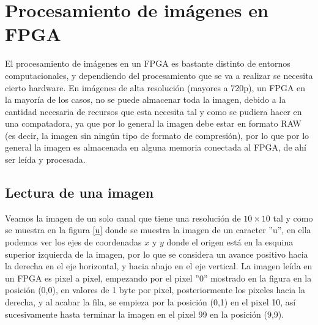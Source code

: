 \documentclass[twoside,spanish,ESP,MSc]{plantillaLabUPV}
\theoremstyle{definition}
\begin{document}
\section{Procesamiento de imágenes en FPGA}

El procesamiento de imágenes en un FPGA es bastante distinto de entornos computacionales, y dependiendo del procesamiento que se va a realizar se necesita cierto hardware. En imágenes de alta resolución (mayores a 720p), un FPGA en la mayoría de los casos, no se puede almacenar toda la imagen, debido a la cantidad necesaria de recursos que esta necesita tal y como se pudiera hacer en una compatadora, ya que por lo general la imagen debe estar en formato RAW (es decir, la imagen sin ningún tipo de formato de compresión), por lo que por lo general la imagen es almacenada en alguna memoria conectada al FPGA, de ahí ser leída y procesada.

\subsection*{Lectura de una imagen}
Veamos la imagen de un solo canal que tiene una resolución de $10\times10$ tal y como se muestra en la figura \ref{u} donde se muestra la imagen de un caracter ''u'', en ella podemos ver los ejes de coordenadas $x$ y $y$ donde el origen está en la esquina superior izquierda de la imagen, por lo que se considera un avance positivo hacia la derecha en el eje horizontal, y hacia abajo en el eje vertical. La imagen leída en un FPGA es pixel a pixel, empezando por el pixel ''0'' mostrado en la figura en la posición (0,0), en valores de 1 byte por pixel, posteriormente los pixeles hacia la derecha, y al acabar la fila, se empieza por la posición (0,1) en el pixel 10, así sucesivamente hasta terminar la imagen en el pixel 99 en la posición (9,9).
\end{document}
